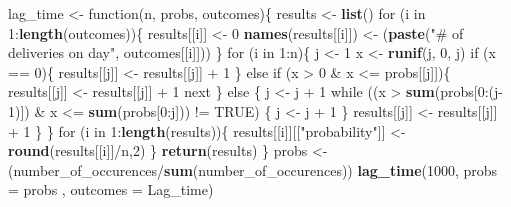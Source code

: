 \documentclass[]{article}
\newenvironment{Shaded}{\begin{snugshade}}{\end{snugshade}}
\newcommand{\KeywordTok}[1]{\textcolor[rgb]{0.13,0.29,0.53}{\textbf{{#1}}}}
\newcommand{\DataTypeTok}[1]{\textcolor[rgb]{0.13,0.29,0.53}{{#1}}}
\newcommand{\DecValTok}[1]{\textcolor[rgb]{0.00,0.00,0.81}{{#1}}}
\newcommand{\StringTok}[1]{\textcolor[rgb]{0.31,0.60,0.02}{{#1}}}
\newcommand{\OtherTok}[1]{\textcolor[rgb]{0.56,0.35,0.01}{{#1}}}
\newcommand{\NormalTok}[1]{{#1}}
\begin{document}
\begin{Shaded}
\begin{Highlighting}[]
\NormalTok{lag_time <-}\StringTok{ }\NormalTok{function(n, probs, outcomes)\{}
        \NormalTok{results <-}\StringTok{ }\KeywordTok{list}\NormalTok{()}
        \NormalTok{for (i in }\DecValTok{1}\NormalTok{:}\KeywordTok{length}\NormalTok{(outcomes))\{}
         \NormalTok{results[[i]] <-}\StringTok{ }\DecValTok{0}
         \KeywordTok{names}\NormalTok{(results[[i]]) <-}\StringTok{ }\NormalTok{(}\KeywordTok{paste}\NormalTok{(}\StringTok{"# of deliveries on day"}\NormalTok{, outcomes[[i]]))}
        \NormalTok{\}}
     \NormalTok{for (i in }\DecValTok{1}\NormalTok{:n)\{}
       \NormalTok{j <-}\StringTok{ }\DecValTok{1} 
       \NormalTok{x <-}\StringTok{ }\KeywordTok{runif}\NormalTok{(j, }\DecValTok{0}\NormalTok{, j)}
       \NormalTok{if (x ==}\StringTok{ }\DecValTok{0}\NormalTok{)\{}
        \NormalTok{results[[j]] <-}\StringTok{ }\NormalTok{results[[j]] +}\StringTok{ }\DecValTok{1}
       \NormalTok{\} else if (x >}\StringTok{ }\DecValTok{0} \NormalTok{&}\StringTok{ }\NormalTok{x <=}\StringTok{ }\NormalTok{probs[[j]])\{}
        \NormalTok{results[[j]] <-}\StringTok{ }\NormalTok{results[[j]] +}\StringTok{ }\DecValTok{1}
        \NormalTok{next}
       \NormalTok{\} else \{}
       \NormalTok{j <-}\StringTok{ }\NormalTok{j +}\StringTok{ }\DecValTok{1}
       \NormalTok{while ((x >}\StringTok{ }\KeywordTok{sum}\NormalTok{(probs[}\DecValTok{0}\NormalTok{:(j}\DecValTok{-1}\NormalTok{)]) &}\StringTok{ }\NormalTok{x <=}\StringTok{ }\KeywordTok{sum}\NormalTok{(probs[}\DecValTok{0}\NormalTok{:j])) !=}\StringTok{ }\OtherTok{TRUE}\NormalTok{) \{}
       \NormalTok{j <-}\StringTok{ }\NormalTok{j +}\StringTok{ }\DecValTok{1}
       \NormalTok{\}}
       \NormalTok{results[[j]] <-}\StringTok{ }\NormalTok{results[[j]] +}\StringTok{ }\DecValTok{1}
       \NormalTok{\}}
     \NormalTok{\}}
    \NormalTok{for (i in }\DecValTok{1}\NormalTok{:}\KeywordTok{length}\NormalTok{(results))\{}
     \NormalTok{results[[i]][[}\StringTok{"probability"}\NormalTok{]] <-}\StringTok{ }\KeywordTok{round}\NormalTok{(results[[i]]/n,}\DecValTok{2}\NormalTok{)}
    \NormalTok{\}}
  \KeywordTok{return}\NormalTok{(results)}
\NormalTok{\}}
\NormalTok{probs <-}\StringTok{ }\NormalTok{(number_of_occurences/}\KeywordTok{sum}\NormalTok{(number_of_occurences))}
\KeywordTok{lag_time}\NormalTok{(}\DecValTok{1000}\NormalTok{, }\DataTypeTok{probs =} \NormalTok{probs , }\DataTypeTok{outcomes =} \NormalTok{Lag_time)}
\end{Highlighting}
\end{Shaded}
\end{document}
